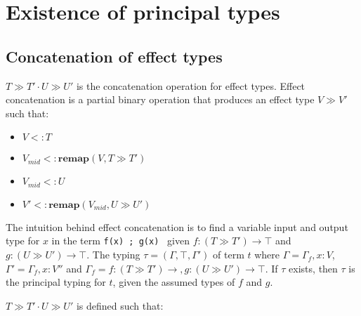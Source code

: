 \documentclass[preprint]{sigplanconf}
\newcommand{\remapapp}[3]{\ensuremath{\mathbf{remap}(#1, #2 \gg #3)}}
\begin{document}
\section{Existence of principal types}
\label{app:principal}

\subsection{Concatenation of effect types}
$T \gg T' \cdot U \gg U'$ is the concatenation operation for effect types. 
Effect concatenation is a partial binary operation that produces an 
effect type $V \gg V'$ such that:

\begin{itemize}
\item $V <: T$
\item $V_{mid} <: \remapapp{V}{T}{T'}$
\item $V_{mid} <: U$
\item $V' <: \remapapp{V_{mid}}{U}{U'}$
\end{itemize}

The intuition behind effect concatenation is to find a variable input and
output type for $x$ in the term {\tt f(x) ; g(x) } given 
$f : (T \gg T') \rightarrow \top$ and
$g : (U \gg U') \rightarrow \top$. The typing
$\tau = (\Gamma, \top, \Gamma')$ of term $t$ where
$\Gamma = \Gamma_f, x : V$,
$\Gamma' = \Gamma_f, x : V''$ and
$\Gamma_f = f : (T \gg T') \rightarrow, g : (U \gg U') \rightarrow \top$.
If $\tau$ exists, then $\tau$ is the principal typing for $t$, given
the assumed types of $f$ and $g$.

$T \gg T' \cdot U \gg U'$ is defined such that:
\end{document}

